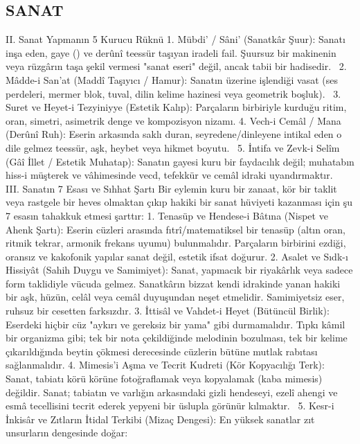 \documentclass[11pt,a4paper]{article}
\begin{document}
\subsection{SANAT}



II. Sanat Yapmanın 5 Kurucu Rüknü
 1. Mübdi' / Sâni' (Sanatkâr Şuur): Sanatı inşa eden, gaye () ve derûnî teessür taşıyan iradeli fail. Şuursuz bir makinenin veya rüzgârın taşa şekil vermesi "sanat eseri" değil, ancak tabii bir hadisedir.  
 2. Mâdde-i San'at (Maddî Taşıyıcı / Hamur): Sanatın üzerine işlendiği vasat (ses perdeleri, mermer blok, tuval, dilin kelime hazinesi veya geometrik boşluk).  
 3. Suret ve Heyet-i Tezyiniyye (Estetik Kalıp): Parçaların birbiriyle kurduğu ritim, oran, simetri, asimetrik denge ve kompozisyon nizamı.
 4. Vech-i Cemâl / Mana (Derûnî Ruh): Eserin arkasında saklı duran, seyredene/dinleyene intikal eden o dile gelmez teessür, aşk, heybet veya hikmet boyutu.  
 5. İntifa ve Zevk-i Selîm (Gâî İllet / Estetik Muhatap): Sanatın gayesi kuru bir faydacılık değil; muhatabın hiss-i müşterek ve vâhimesinde vecd, tefekkür ve cemâl idraki uyandırmaktır.  
III. Sanatın 7 Esası ve Sıhhat Şartı
Bir eylemin kuru bir zanaat, kör bir taklit veya rastgele bir heves olmaktan çıkıp hakiki bir sanat hüviyeti kazanması için şu 7 esasın tahakkuk etmesi şarttır:
 1. Tenasüp ve Hendese-i Bâtına (Nispet ve Ahenk Şartı):
Eserin cüzleri arasında fıtrî/matematiksel bir tenasüp (altın oran, ritmik tekrar, armonik frekans uyumu) bulunmalıdır. Parçaların birbirini ezdiği, oransız ve kakofonik yapılar sanat değil, estetik ifsat doğurur.
 2. Asalet ve Sıdk-ı Hissiyât (Sahih Duygu ve Samimiyet):
Sanat, yapmacık bir riyakârlık veya sadece form taklidiyle vücuda gelmez. Sanatkârın bizzat kendi idrakinde yanan hakiki bir aşk, hüzün, celâl veya cemâl duyuşundan neşet etmelidir. Samimiyetsiz eser, ruhsuz bir cesetten farksızdır.
 3. İttisâl ve Vahdet-i Heyet (Bütüncül Birlik):
Eserdeki hiçbir cüz "aykırı ve gereksiz bir yama" gibi durmamalıdır. Tıpkı kâmil bir organizma gibi; tek bir nota çekildiğinde melodinin bozulması, tek bir kelime çıkarıldığında beytin çökmesi derecesinde cüzlerin bütüne mutlak rabıtası sağlanmalıdır.
 4. Mimesis'i Aşma ve Tecrit Kudreti (Kör Kopyacılığı Terk):
Sanat, tabiatı körü körüne fotoğraflamak veya kopyalamak (kaba mimesis) değildir. Sanat; tabiatın ve varlığın arkasındaki gizli hendeseyi, ezelî ahengi ve esmâ tecellisini tecrit ederek yepyeni bir üslupla görünür kılmaktır.  
 5. Kesr-i İnkisâr ve Zıtların İtidal Terkibi (Mizaç Dengesi):
En yüksek sanatlar zıt unsurların dengesinde doğar:  
\end{document}
